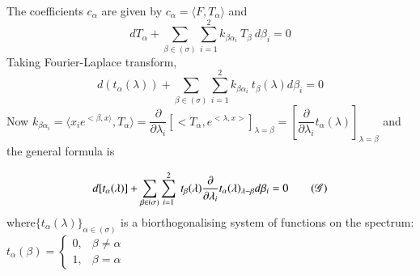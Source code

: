 The coefficients $c_\alpha$ are given by $c_\alpha = \langle F,
T_\alpha \rangle$ and  
$$
dT_\alpha + \sum_{\beta \in (\sigma)} \sum_{i=1}^2 k_{\beta \alpha_i}
~ T_\beta ~ d \beta_i = 0 
$$
Taking Fourier-Laplace transform, 
$$
d (t_\alpha (\lambda )) + \sum_{\beta \in (\sigma)} \sum_{i=1}^2
k_{\beta \alpha_i} ~ t_\beta (\lambda) d \beta_i = 0 
$$
Now $k_{\beta \alpha_i} = \langle x_i e^{< \beta,  x\rangle},
T_\alpha \rangle = \dfrac{\partial}{\partial \lambda_i} \left[ < T_\alpha,
  e^{< \lambda,  x >} \right]_{\lambda = \beta} = \left[
  \dfrac{\partial}{\partial \lambda_i} t_\alpha (\lambda )
  \right]_{\lambda = \beta}$ and the general formula is  

\begin{equation}
  d [t_\alpha (\lambda )] + \sum_{\beta \in (\sigma )} \sum_{i=1}^2 ~
  t_\beta (\lambda ) \frac{\partial}{\partial \lambda_i} t_\alpha
  (\lambda)_{\lambda - \beta} d \beta_i = 0
  \tag{$\mathscr{G}$}\label{part2:chap3:sec3:eqG}  
\end{equation}
where\pageoriginale $\Big\{ t_\alpha (\lambda ) \Big\}_{\alpha \in (\sigma)}$ is a
biorthogonalising system of functions on the spectrum: $t_\alpha
(\beta) = \begin{cases} 0, & \beta \neq \alpha \\ 1, & \beta =
  \alpha \end{cases}$ 

\section{}\label{part2:chap3:sec4}%


